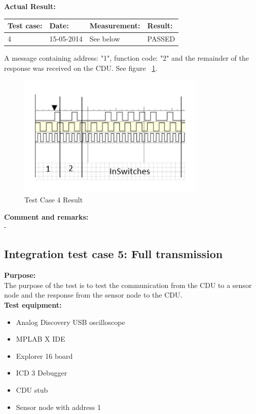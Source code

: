 \textbf{Actual Result:}\\
\begin{table}[H]
\centering
\begin{tabular}{|p{2cm}|p{2cm}|p{3cm}|p{2cm}|}\hline
\textbf{Test case:} & \textbf{Date:} & \textbf{Measurement:} & \textbf{Result:} \\ \hline
4 & 15-05-2014 & See below & PASSED \\ \hline
\end{tabular}
\end{table}
A message containing address: "1", function code: "2" and the remainder of the response was received on the CDU. See figure ~\ref{fig:InteTestCase4}.
\begin{figure}[H]
\centering
\includegraphics[width=0.8\textwidth]{billeder/intetestcase4}
\caption{Test Case 4 Result}
\label{fig:InteTestCase4}
\end{figure}


\textbf{Comment and remarks:}\\
-\\
\subsection{Integration test case 5: Full transmission}
\textbf{Purpose:}\\
The purpose of the test is to test the communication from the CDU to a sensor node and the response from the sensor node to the CDU.\\

\textbf{Test equipment:}
\begin{itemize}
\item Analog Discovery USB oscilloscope
\item MPLAB X IDE
\item Explorer 16 board
\item ICD 3 Debugger
\item CDU stub
\item Sensor node with address 1
\end{itemize}


